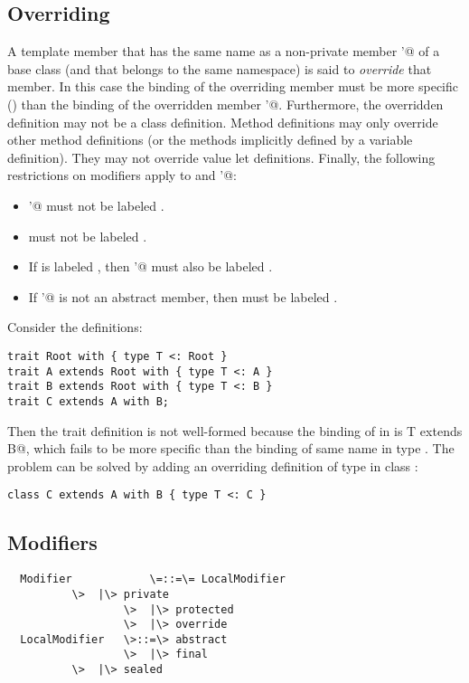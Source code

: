 \documentclass[11pt]{report}
\newcommand{\ifqualified}[1]{}
\begin{document}
\subsection{Overriding}
\label{sec:overriding}

A template member \verb@M@ that has the same \ifqualified{qualified}
name as a non-private member \verb@M'@ of a base class (and that
belongs to the same namespace) is said to {\em override} that member.
In this case the binding of the overriding member \verb@M@ must be
more specific () than the binding of the
overridden member \verb@M'@.  Furthermore, the overridden definition
may not be a class definition.  Method definitions may only override
other method definitions (or the methods implicitly defined by a
variable definition). They may not override value let definitions.
Finally, the following restrictions on modifiers apply to \verb@M@ and
\verb@M'@:
\begin{itemize}
\item
\verb@M'@ must not be labeled \verb@final@.
\item
\verb@M@ must not be labeled \verb@private@.
\item
If \verb@M@ is labeled \verb@protected@, then \verb@M'@ must also be
labeled \verb@protected@.
\item
If \verb@M'@ is not an abstract member, then
\verb@M@ must be labeled \verb@override@.
\end{itemize}

\example\label{ex:compound-a}
Consider the definitions:
\begin{verbatim}
trait Root with { type T <: Root }
trait A extends Root with { type T <: A }
trait B extends Root with { type T <: B }
trait C extends A with B;
\end{verbatim}
Then the trait definition \verb@C@ is not well-formed because the
binding of \verb@T@ in \verb@C@ is
\verb@type T extends B@,
which fails to be more specific than the binding of same name in type
\verb@A@. The problem can be solved by adding an overriding 
definition of type \verb@T@ in class \verb@C@:
\begin{verbatim}
class C extends A with B { type T <: C }
\end{verbatim}

\subsection{Modifiers}
\label{sec:modifiers}

\syntax\begin{verbatim}
  Modifier            \=::=\= LocalModifier
		  \>  |\> private
                  \>  |\> protected
                  \>  |\> override 
  LocalModifier   \>::=\> abstract
                  \>  |\> final
		  \>  |\> sealed
\end{verbatim}
\end{document}
